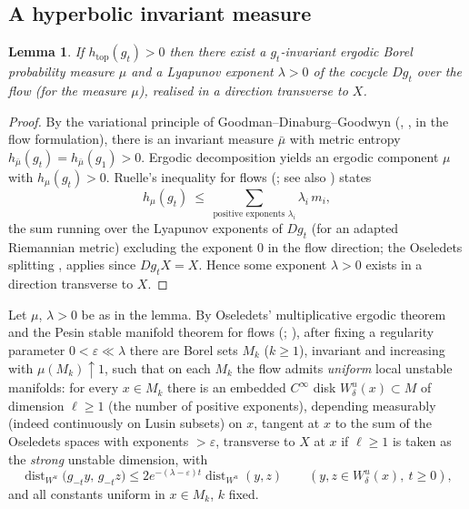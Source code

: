 \documentclass[11pt]{amsart}
\theoremstyle{plain}
\newtheorem{lemma}[theorem]{Lemma}
\theoremstyle{definition}
\theoremstyle{remark}
\newcommand{\flow}{g_t}
\begin{document}
\subsection{A hyperbolic invariant measure}

\begin{lemma}\label{l:hypmeasure}
If $h_{\mathrm{top}}(\flow)>0$ then there exist a
$\flow$-invariant ergodic Borel probability measure $\mu$ and a
Lyapunov exponent $\lambda>0$ of the cocycle $Dg_t$ over the flow
(for the measure $\mu$), realised in a direction transverse to $X$.
\end{lemma}

\begin{proof}
By the variational principle of Goodman--Dinaburg--Goodwyn
(\cite{Goodman}, \cite[Th.~4.5.3]{Waltensurvey},
\cite[Th.~4.1.11]{KH} in the flow formulation), there is an
invariant measure $\bar\mu$ with metric entropy
$h_{\bar\mu}(\flow)=h_{\bar\mu}(g_1)>0$.  Ergodic decomposition
\cite[\S4.4]{ErgodicTheory} yields an ergodic component $\mu$ with
$h_\mu(\flow)>0$.  Ruelle's inequality for flows
(\cite{RuelleIneq}; see also \cite[Cor.~S.5.5]{KatokHasselblattPES})
states
\[
h_\mu(\flow)\ \le\ \sum_{\text{positive exponents }\lambda_i}
\lambda_i\,m_i ,
\]
the sum running over the Lyapunov exponents of $Dg_t$ (for an
adapted Riemannian metric) excluding the exponent $0$ in the flow
direction; the Oseledets splitting
\cite[Th.~1.7]{Oseledets},\cite[Th.~3.4.3]{KatokHasselblattPES}
applies since $Dg_tX=X$.  Hence some exponent $\lambda>0$ exists in
a direction transverse to $X$.
\end{proof}

Let $\mu$, $\lambda>0$ be as in the lemma.  By Oseledets'
multiplicative ergodic theorem and the Pesin stable manifold theorem
for flows (\cite[\S3, Th.~3.5--3.7]{KatokHasselblattPES};
\cite{Pesin}), after fixing a regularity parameter $0<\varepsilon\ll
\lambda$ there are Borel sets $M_k$ ($k\ge1$), invariant and
increasing with $\mu(M_k)\uparrow1$, such that on each $M_k$ the
flow admits \emph{uniform} local unstable manifolds: for every
$x\in M_k$ there is an embedded $C^\infty$ disk
$W^u_\delta(x)\subset M$ of dimension $\ell\ge1$ (the number of
positive exponents), depending measurably (indeed continuously on
Lusin subsets) on $x$, tangent at $x$ to the sum of the Oseledets
spaces with exponents $>\varepsilon$, transverse to $X$ at $x$ if
$\ell\ge1$ is taken as the \emph{strong} unstable dimension, with
\begin{equation}\label{eq:unifcont}
\operatorname{dist}_{W^u}\bigl(g_{-t}y,\,g_{-t}z\bigr)
\le 2e^{-(\lambda-\varepsilon)t}\operatorname{dist}_{W^u}(y,z)
\qquad (y,z\in W^u_\delta(x),\ t\ge0),
\end{equation}
and all constants uniform in $x\in M_k$, $k$ fixed.
\end{document}
